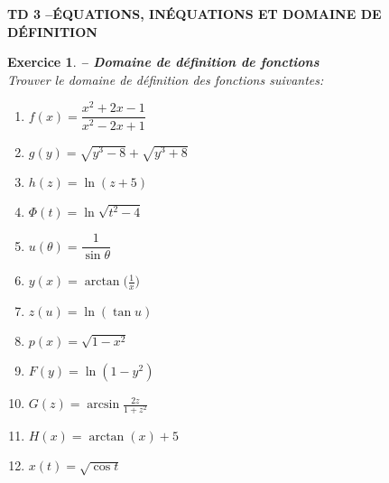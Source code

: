 \documentclass[a4paper,11pt]{article}
\newenvironment{alphate}{\begin{enumerate}[label=\alph*)]}{\end{enumerate}}
\newtheorem{exo}{Exercice}
\newenvironment{exercice}{\begin{exo} \em}{\end{exo}}
\begin{document}



\begin{center}
{\bf TD 3 \quad--\quad \'EQUATIONS, IN\'EQUATIONS ET DOMAINE DE 
D\'EFINITION}
\end{center}
\bigskip 

\addtocounter{exo}{14}


\begin{exercice} {\bf -- Domaine de d\'efinition de fonctions}
\label{TD6-domaine}\\ 
Trouver le domaine de d\'efinition des fonctions suivantes:
\begin{multicols}{3}
\begin{alphate}
\item $f(x)=\dfrac{x^2+2x-1}{x^2-2x+1}$ \smallskip 
\item $g(y)=\sqrt{y^3-8}+\sqrt{y^3+8}$ \smallskip 
\item $h(z)=\ln(z+5)$ \smallskip 
\item $\Phi(t)=\ln\sqrt{t^2-4}$
\item $u(\theta)=\dfrac{1}{\sin\theta}$ \smallskip 
\item $y(x)=\arctan \big(\frac{1}{x}\big)$ \smallskip 
\item $z(u)=\ln(\tan u)$ \smallskip 
\item $p(x)=\sqrt{1-x^2}$
\item $F(y)=\ln(1-y^2)$ \smallskip 
\item $G(z)=\arcsin \frac{2z}{1+z^2}$ \smallskip 
\item $H(x)=\arctan(x)+5$ \smallskip 
\item $x(t)=\sqrt{\cos t}$ 
\end{alphate}
\end{multicols}
\end{exercice}
\bigskip

\end{document}
